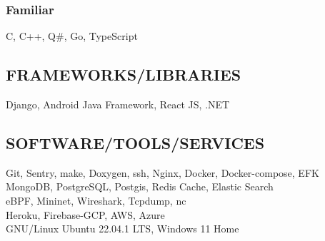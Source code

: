 \documentclass[letterpaper]{deedy-resume} %
\begin{document}
\begin{minipage}[t]{0.33\textwidth}
\subsubsection*{Familiar}
\squeezeup
C, C++, Q\#, Go, TypeScript

\sectionspace %

\subsection{FRAMEWORKS/LIBRARIES}
Django, Android Java Framework, React JS, .NET

\sectionspace %

\subsection{SOFTWARE/TOOLS/SERVICES}
Git, Sentry, make, Doxygen, ssh, Nginx, Docker, Docker-compose, EFK \\
MongoDB, PostgreSQL, Postgis, Redis Cache, Elastic Search \\
eBPF, Mininet, Wireshark, Tcpdump, nc \\
Heroku, Firebase-GCP, AWS, Azure \\
GNU/Linux Ubuntu 22.04.1 LTS, Windows 11 Home


\sectionspace %





\end{minipage}
\end{document}
